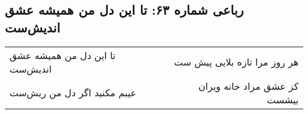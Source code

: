 \begin{center}
\section*{رباعی شماره ۶۳: تا این دل من همیشه عشق اندیش‌ست}
\label{sec:sh063}
\begin{longtable}{l p{0.5cm} r}
تا این دل من همیشه عشق اندیش‌ست
&&
هر روز مرا تازه بلایی پیش ست
\\
عیبم مکنید اگر دل من ریش‌ست
&&
کز عشق مراد خانه ویران بیشست
\\
\end{longtable}
\end{center}
